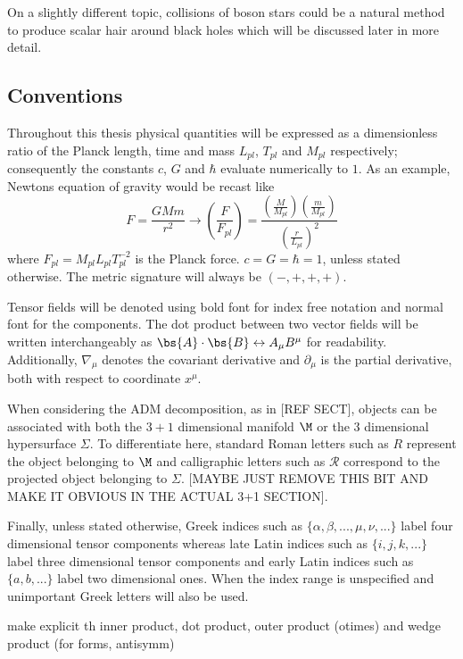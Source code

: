 On a slightly different topic, collisions of boson stars could be a natural method to produce scalar hair around black holes which will be discussed later in more detail. 

\subsection{Conventions}
Throughout this thesis physical quantities will be expressed as a dimensionless ratio of the Planck length, time and mass $L_{pl}$, $T_{pl}$ and $M_{pl}$ respectively; consequently the constants $c$, $G$ and $\hbar$ evaluate numerically to $1$. As an example, Newtons equation of gravity would be recast like
\begin{equation}
F = \frac{G M m}{r^2} \rightarrow \left(\frac{F}{F_{pl}} \right)=\frac{\left(\frac{M}{M_{pl}} \right)\left(\frac{m}{M_{pl}} \right)  }{\left(\frac{r}{L_{pl}} \right)^2}
\end{equation}
where $F_{pl} = M_{pl}L_{pl}T_{pl}^{-2}$ is the Planck force.
$c=G=\hbar=1$, unless stated otherwise. The metric signature will always be $(-,+,+,+)$. 

Tensor fields will be denoted using bold font for
index free notation and normal font for the components.
The dot product between two vector fields will be written interchangeably as $\bs{A} \cdot \bs{B} \leftrightarrow {A}_\mu {B}^\mu$ for readability.
Additionally, $\nabla_\mu$ denotes the covariant derivative and $\partial_\mu$
is the partial derivative, both with respect to coordinate $x^\mu$.

When considering the ADM decomposition, as in [REF SECT], objects can be associated with both the $3+1$ dimensional manifold $\M$ or the $3$ dimensional hypersurface $\Sigma$. To differentiate here, standard Roman letters such as $R$ represent the object belonging to $\M$ and calligraphic letters such as $\mathcal{R}$ correspond to the projected object belonging to $\Sigma$. [MAYBE JUST REMOVE THIS BIT AND MAKE IT OBVIOUS IN THE ACTUAL 3+1 SECTION].

Finally, unless stated otherwise, Greek indices such
as $\{\alpha, \beta, ..., \mu, \nu, ...\}$ label four dimensional tensor components whereas late Latin indices such as $\{i, j, k, ...\}$ label
three dimensional tensor components and early Latin indices such as $\{a, b, ...\}$ label two dimensional ones. When the index range is unspecified and unimportant Greek letters will also be used.

make explicit th inner product, dot product, outer product (otimes) and wedge product (for forms, antisymm)






